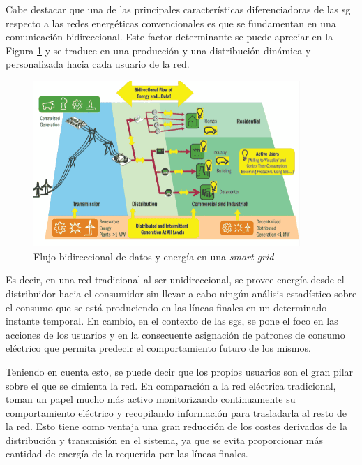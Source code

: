 \vspace{3mm}

Cabe destacar que una de las principales características diferenciadoras de las \gls{sg} respecto a las redes energéticas convencionales es que se fundamentan en una comunicación bidireccional. Este factor determinante se puede apreciar en la Figura \ref{fig:bidireccional} y se traduce en una producción y una distribución dinámica y personalizada hacia cada usuario de la red. 

\vspace{3mm}

\begin{figure}[h]
  \centering
  \includegraphics[width=0.9\textwidth]{img/teoria/sg.png}
  \caption{Flujo bidireccional de datos y energía en una \textit{smart grid} \cite{sins}}
  \label{fig:bidireccional}
\end{figure}

\vspace{3mm}

Es decir, en una red tradicional al ser unidireccional, se provee energía desde el distribuidor hacia el consumidor sin llevar a cabo ningún análisis estadístico sobre el consumo que se está produciendo en las líneas finales en un determinado instante temporal. En cambio, en el contexto de las \gls{sg}s, se pone el foco en las acciones de los usuarios y en la consecuente asignación de patrones de consumo eléctrico que permita predecir el comportamiento futuro de los mismos. \cite{convencional}

\vspace{3mm}

Teniendo en cuenta esto, se puede decir que los propios usuarios son el gran pilar sobre el que se cimienta la red. En comparación a la red eléctrica tradicional, toman un papel mucho más activo monitorizando continuamente su comportamiento eléctrico y recopilando información para trasladarla al resto de la red. Esto tiene como ventaja una gran reducción de los costes derivados de la distribución y transmisión en el sistema, ya que se evita proporcionar más cantidad de energía de la requerida por las líneas finales. \cite{iotfutura}

